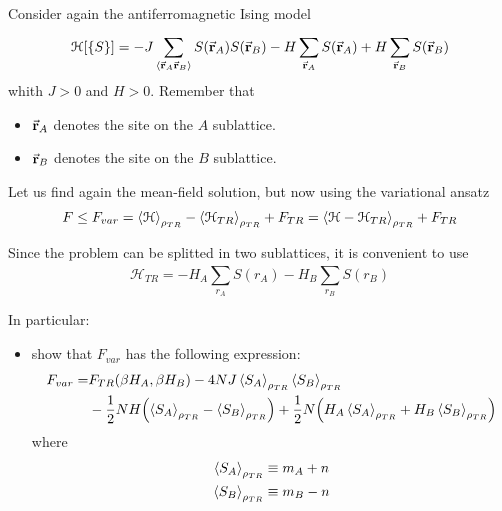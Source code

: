 \documentclass[../../Main/Main.tex]{subfiles}
\begin{document}
\begin{exercise}{}{}
Consider again the antiferromagnetic Ising model
\begin{equation*}
  \mathcal{H}[\{ S \}  ] = - J \sum_{\expval{\va{r}_A \va{r}_B} }^{} S (\va{r}_A) S(\va{r}_B) - H \sum_{\va{r}_A}^{} S (\va{r}_A) + H \sum_{\va{r}_B}^{} S (\va{r}_B)
\end{equation*}
whith \( J>0 \) and \( H>0 \). Remember that
\begin{itemize}
\item \( \va{r}_A \) denotes the site on the \( A \) sublattice.
\item \( \va{r}_B \) denotes the site on the \( B \) sublattice.
\end{itemize}

Let us find again the mean-field solution, but now using the variational ansatz
\begin{equation*}
  F \le F_{var} = \expval{\mathcal{H}}_{\rho _{TR}} - \expval{\mathcal{H}_{TR} }_{\rho _{TR}}  + F_{TR} = \expval{\mathcal{H} - \mathcal{H}_{TR}}_{\rho _{TR}} + F_{TR}
\end{equation*}
\begin{remark}
  Since the problem can be splitted in two sublattices, it is convenient to use
  \begin{equation*}
    \mathcal{H}_{TR} = - H_A \sum_{r_A}^{} S(r_A) - H_B \sum_{r_B}^{}  S(r_B)
  \end{equation*}
\end{remark}
In particular:
\begin{itemize}
\item show that \( F_{var} \) has the following expression:
\begin{equation*}
\begin{split}
F_{var}  = &  F_{TR} (\beta H_A, \beta H_B)
- 4 NJ \expval{S_A}_{\rho _{TR}}  \expval{S_B}_{\rho _{TR}} \\
 &- \frac{1}{2} NH \qty(\expval{S_A}_{\rho _{TR}}
 - \expval{S_B}_{\rho _{TR}}   )
 + \frac{1}{2} N \qty(H_A \expval{S_A}_{\rho _{TR}}  + H_B \expval{S_B}_{\rho _{TR}}   )
\end{split}
\end{equation*}
where
\begin{subequations}
\begin{align*}
   \expval{S_A}_{\rho _{TR}}  & \equiv m_A + n \\
    \expval{S_B}_{\rho _{TR}}  & \equiv m_B - n
\end{align*}
\end{subequations}

\end{itemize}
\end{exercise}
\end{document}
